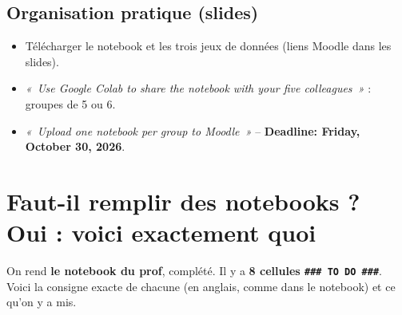 \documentclass[11pt,a4paper]{article}
\newcommand{\f}[1]{\texttt{#1}}
\newcommand{\en}[1]{\textit{«~#1~»}}
\begin{document}
\subsection{Organisation pratique (slides)}
\begin{itemize}
  \item Télécharger le notebook et les trois jeux de données (liens Moodle dans les slides).
  \item \en{Use Google Colab to share the notebook with your five colleagues} : groupes de 5 ou 6.
  \item \en{Upload one notebook per group to Moodle} -- \textbf{Deadline: Friday, October 30, 2026}.
\end{itemize}

\section{Faut-il remplir des notebooks ? Oui : voici exactement quoi}

On rend \textbf{le notebook du prof}, complété. Il y a \textbf{8 cellules \f{\#\#\# TO DO \#\#\#}}. Voici la consigne exacte de chacune (en anglais, comme dans le notebook) et ce qu'on y a mis.
\end{document}
